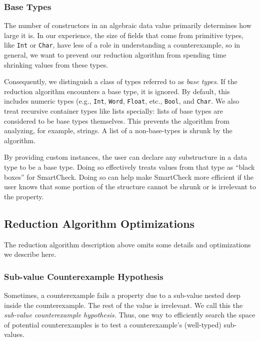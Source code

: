 \documentclass{sigplanconf}
\newcommand{\ttp}[1]{\texttt{#1}}
\begin{document}
\subsubsection{Base Types}\label{sec:base}

The number of constructors in an algebraic data value primarily determines how
large it is.  In our experience, the size of fields that come from primitive
types, like \ttp{Int} or \ttp{Char}, have less of a role in understanding a
counterexample, so in general, we want to prevent our reduction algorithm from
spending time shrinking values from these types.

Consequently, we distinguish a class of types referred to as \emph{base types}.
If the reduction algorithm encounters a base type, it is ignored.  By default,
this includes numeric types (e.g., \ttp{Int}, \ttp{Word}, \ttp{Float}, etc.,
\ttp{Bool}, and \ttp{Char}.  We also treat recursive container types like lists
specially: lists of base types are considered to be base types themselves.  This
prevents the algorithm from analyzing, for example, strings.  A list of a
non-base-types is shrunk by the algorithm.

By providing custom instances, the user can declare any substructure in a data
type to be a base type.  Doing so effectively treats values from that type as
``black boxes'' for SmartCheck.  Doing so can help make SmartCheck more
efficient if the user knows that some portion of the structure cannot be shrunk
or is irrelevant to the property.

\subsection{Reduction Algorithm Optimizations}
The reduction algorithm description above omits some details and optimizations
we describe here.

\subsubsection{Sub-value Counterexample Hypothesis}\label{sec:subval}
Sometimes, a counterexample fails a property due to a sub-value nested deep
inside the counterexample.  The rest of the value is irrelevant.  We call this
the \emph{sub-value counterexample hypothesis.}  Thus, one way to efficiently
search the space of potential counterexamples is to test a counterexample's
(well-typed) sub-values.
\end{document}
